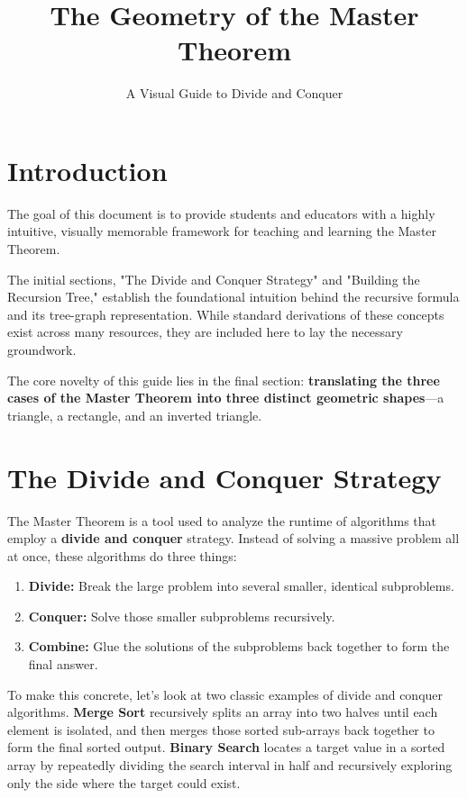 \documentclass[11pt, a4paper]{article}
\title{\Huge \textbf{The Geometry of the Master Theorem}}
\author{A Visual Guide to Divide and Conquer}
\date{}
\begin{document}
\maketitle

\section*{Introduction}

The goal of this document is to provide students and educators with a highly intuitive, visually memorable framework for teaching and learning the Master Theorem. 

The initial sections, "The Divide and Conquer Strategy" and "Building the Recursion Tree," establish the foundational intuition behind the recursive formula and its tree-graph representation. While standard derivations of these concepts exist across many resources, they are included here to lay the necessary groundwork. 

The core novelty of this guide lies in the final section: \textbf{translating the three cases of the Master Theorem into three distinct geometric shapes}—a triangle, a rectangle, and an inverted triangle.


\section*{The Divide and Conquer Strategy}

The Master Theorem is a tool used to analyze the runtime of algorithms that employ a \textbf{divide and conquer} strategy. Instead of solving a massive problem all at once, these algorithms do three things:
\begin{enumerate}
    \item \textbf{Divide:} Break the large problem into several smaller, identical subproblems.
    \item \textbf{Conquer:} Solve those smaller subproblems recursively.
    \item \textbf{Combine:} Glue the solutions of the subproblems back together to form the final answer.
\end{enumerate}
To make this concrete, let's look at two classic examples of divide and conquer algorithms. \textbf{Merge Sort} recursively splits an array into two halves until each element is isolated, and then merges those sorted sub-arrays back together to form the final sorted output. \textbf{Binary Search} locates a target value in a sorted array by repeatedly dividing the search interval in half and recursively exploring only the side where the target could exist.
\end{document}
